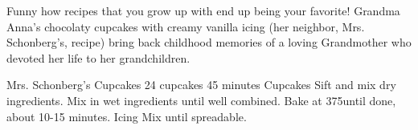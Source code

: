 Funny how recipes that you grow up with end up being your favorite! Grandma
Anna's chocolaty cupcakes with creamy vanilla icing (her neighbor, Mrs.
Schonberg's, recipe) bring back childhood memories of a loving Grandmother who
devoted her life to her grandchildren.

\begin{recipe}{Mrs. Schonberg's Cupcakes} {24 cupcakes} {45 minutes}
\freeform Cupcakes
Sift and mix dry ingredients.
Mix in wet ingredients until well combined. Bake at 375\degrees until done,
about 10-15 minutes.
\freeform Icing
Mix until spreadable.

\end{recipe}

